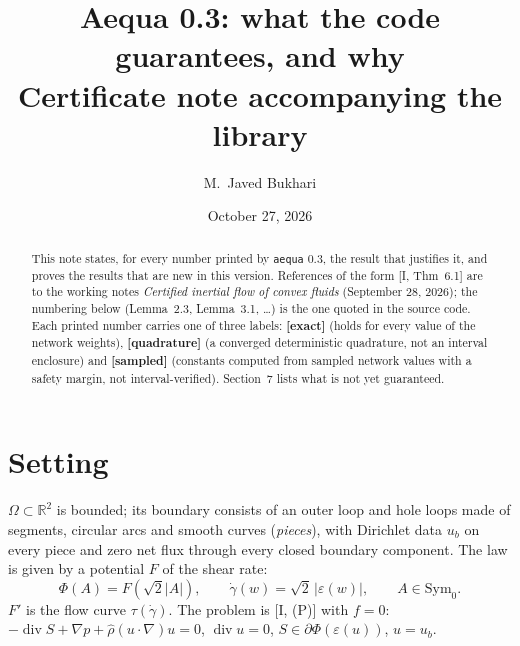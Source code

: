 \documentclass[11pt]{article}
\title{Aequa 0.3: what the code guarantees, and why\\[2pt]\large Certificate note accompanying the library}
\author{M.~Javed Bukhari}
\date{October 27, 2026}
\theoremstyle{definition}
\newcommand{\R}{\mathbb{R}}
\newcommand{\eps}{\varepsilon}
\newcommand{\gd}{\dot\gamma}
\begin{document}
\maketitle

\begin{abstract}
This note states, for every number printed by \texttt{aequa} 0.3, the result that justifies it, and proves the
results that are new in this version. References of the form [I, Thm~6.1] are to the working notes
\emph{Certified inertial flow of convex fluids} (September 28, 2026); the numbering below (Lemma~2.3,
Lemma~3.1, \dots) is the one quoted in the source code. Each printed number carries one of three labels:
\textbf{[exact]} (holds for every value of the network weights), \textbf{[quadrature]} (a converged deterministic
quadrature, not an interval enclosure) and \textbf{[sampled]} (constants computed from sampled network values
with a safety margin, not interval-verified). Section~7 lists what is not yet guaranteed.
\end{abstract}

\tableofcontents

\section{Setting}

$\Omega\subset\R^2$ is bounded; its boundary consists of an outer loop and hole loops made of segments,
circular arcs and smooth curves (\emph{pieces}), with Dirichlet data $u_b$ on every piece and zero net flux
through every closed boundary component. The law is given by a potential $F$ of the shear rate:
\[
\Phi(A)=F(\sqrt2|A|),\qquad \gd(w)=\sqrt2\,|\eps(w)|,\qquad A\in\mathrm{Sym}_0 .
\]
$F'$ is the flow curve $\tau(\gd)$. The problem is [I, (P)] with $f=0$:
$-\operatorname{div}S+\nabla p+\hat\rho(u\cdot\nabla)u=0$, $\operatorname{div}u=0$, $S\in\partial\Phi(\eps(u))$, $u=u_b$.
\end{document}
